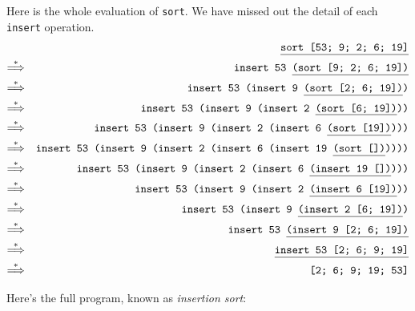 \documentclass[]{book}
\begin{document}
\noindent Here is the whole evaluation of \texttt{sort\! [53;\! 9;\! 2;\! 6;\! 19]}. We have missed out the detail of each \texttt{insert} operation.
\begin{eqnarray*}
 & & \underline{\texttt{sort [53; 9; 2; 6; 19]\vphantom{g}}} \\
 \overset{*}\Longrightarrow & & \texttt{insert 53 \underline{(sort [9; 2; 6; 19])\vphantom{g}}} \\
 \overset{*}\Longrightarrow & & \texttt{insert 53 (insert 9 \underline{\vphantom{g}(sort [2; 6; 19])})} \\
 \overset{*}\Longrightarrow & & \texttt{insert 53 (insert 9 (insert 2 \underline{(sort [6; 19])}))\vphantom{g}} \\
 \overset{*}\Longrightarrow & & \texttt{insert 53 (insert 9 (insert 2 (insert 6 \underline{(sort [19])\vphantom{g}})))} \\
 \overset{*}\Longrightarrow & & \texttt{insert 53 (insert 9 (insert 2 (insert 6 (insert 19 \underline{\vphantom{g}(sort [])}))))\vphantom{g}} \\
  \overset{*}\Longrightarrow & & \texttt{insert 53 (insert 9 (insert 2 (insert 6 \underline{\vphantom{g}(insert 19 [])})))} \\
 \overset{*}\Longrightarrow & & \texttt{insert 53 (insert 9 (insert 2 \underline{(insert 6 [19])\vphantom{g}}))} \\
 \overset{*}\Longrightarrow & & \texttt{insert 53 (insert 9 \underline{\vphantom{g}(insert 2 [6; 19])})} \\
 \overset{*}\Longrightarrow & & \texttt{insert 53 \underline{\vphantom{g}(insert 9 [2; 6; 19])}\vphantom{g}} \\
 \overset{*}\Longrightarrow & & \texttt{\underline{insert 53 [2; 6; 9; 19]\vphantom{g}}} \\
 \overset{*}\Longrightarrow & & \texttt{[2; 6; 9; 19; 53]}
\end{eqnarray*}

\noindent Here's the full program, known as \textit{insertion sort}:
\end{document}
